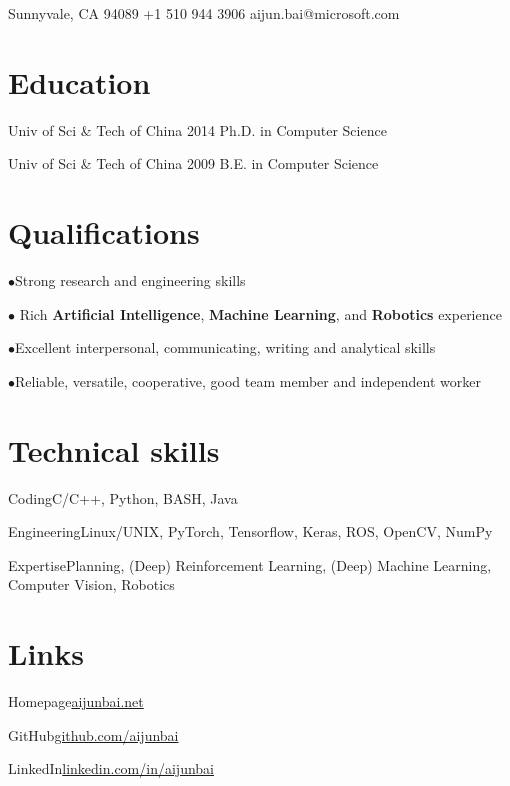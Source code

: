 \documentclass[fontsize=10pt]{tccv}
\begin{document}
\personal
{Sunnyvale, CA 94089}
{+1 510 944 3906}
{aijun.bai@microsoft.com}

\section{Education}

\begin{yearlist}

	\item[Univ of Sci \& Tech of China]{2014}
        {Ph.D. in Computer Science}{}

	\item[Univ of Sci \& Tech of China]{2009}
        {B.E. in Computer Science}{}

\end{yearlist}

\section{Qualifications}

\begin{factlist}
	\item{$\bullet$}{Strong research and engineering skills}
	\item{$\bullet$}{ Rich \textbf{Artificial Intelligence}, \textbf{Machine Learning}, and \textbf{Robotics} experience}
	\item{$\bullet$}{Excellent interpersonal, communicating, writing and analytical skills}
	\item{$\bullet$}{Reliable, versatile, cooperative, good team member and independent worker}
\end{factlist}

\section{Technical skills}

\begin{factlist}
	\item{Coding}{C/C++, Python, BASH, Java}
	\item{Engineering}{Linux/UNIX, PyTorch, Tensorflow, Keras, ROS, OpenCV, NumPy}
	\item{Expertise}{Planning, (Deep) Reinforcement Learning, (Deep) Machine Learning, Computer Vision, Robotics}
\end{factlist}

\section{Links}

\begin{factlist}
	\item{Homepage}{\href{http://aijunbai.github.io/}{aijunbai.net}}
	\item{GitHub}{\href{https://github.com/aijunbai}{github.com/aijunbai}}
	\item{LinkedIn}{\href{https://www.linkedin.com/in/aijunbai}{linkedin.com/in/aijunbai}}
\end{factlist}
\end{document}

